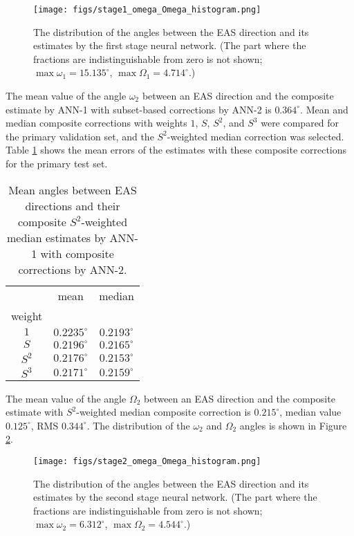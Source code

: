 \documentclass[reprint,
superscriptaddress,
amsmath,amssymb,aps,showkeys,showpacs,
twoside,final,secnumarabic,%
nofootinbib]{revtex4-2}
\begin{document}
\begin{figure}[b!]
\texttt{[image: figs/stage1\_omega\_Omega\_histogram.png]}
\caption{\label{fig_omegas1} The distribution of the angles between the EAS direction and its estimates by the first stage neural network. (The part where the fractions are indistinguishable from zero is not shown; $\max \omega_1 = 15.135^\circ$, $\max \Omega_1 = 4.714^\circ$.)}
\end{figure}


The mean value of the angle $\omega_2$ between an EAS direction and the composite estimate by ANN-1 with subset-based corrections by ANN-2 is $0.364^\circ$. Mean and median composite corrections with weights $1$, $S$, $S^2$, and $S^3$ were compared for the primary validation set, and the $S^2$-weighted median correction was selected. Table \ref{table2} shows the mean errors of the estimates with these composite corrections for the primary test set.


\begin{table}[h!]
\renewcommand{\arraystretch}{1.25}
\renewcommand{\tabcolsep}{3pt}
\begin{center}\caption{Mean angles between EAS directions and their composite $S^2$-weighted median estimates by ANN-1 with composite corrections by ANN-2.}
\begin{tabular}{|c|c|c|}\hline
             &      mean      &     median     \\
weight       &                &                \\ \hline
$1$          & $0.2235^\circ$ & $0.2193^\circ$ \\ \hline
$S$          & $0.2196^\circ$ & $0.2165^\circ$ \\ \hline
$S^2$        & $0.2176^\circ$ & $0.2153^\circ$ \\ \hline
$S^3$        & $0.2171^\circ$ & $0.2159^\circ$ \\ \hline
\end{tabular}\label{table2}
\end{center}
\end{table}


The mean value of the angle $\Omega_2$ between an EAS direction and the composite estimate with $S^2$-weighted median composite correction is $0.215^\circ$, median value $0.125^\circ$, RMS $0.344^\circ$. 
The distribution of the $\omega_2$ and $\Omega_2$ angles is shown in Figure \ref{fig_omegas2}.


\begin{figure}[b!]
\texttt{[image: figs/stage2\_omega\_Omega\_histogram.png]}
\caption{\label{fig_omegas2} The distribution of the angles between the EAS direction and its estimates by the second stage neural network. (The part where the fractions are indistinguishable from zero is not shown; $\max \omega_2 = 6.312^\circ$, $\max \Omega_2 = 4.544^\circ$.)}
\end{figure}
\end{document}
